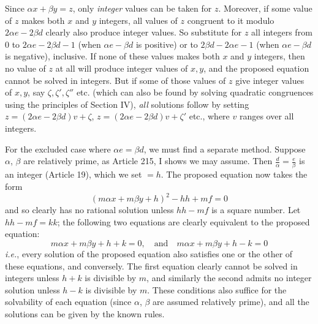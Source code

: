 Since $\alpha x+\beta y=z$, only \textit{integer} values can be taken for $z$. Moreover, if some value of $z$ makes both $x$ and $y$ integers, all values of $z$ congruent to it modulo $2\alpha e-2\beta d$ clearly also produce integer values. So substitute for $z$ all integers from $0$ to $2\alpha e-2\beta d-1$ (when $\alpha e-\beta d$ is positive) or to $2\beta d-2\alpha e-1$ (when $\alpha e-\beta d$ is negative), inclusive. If none of these values makes both $x$ and $y$ integers, then no value of $z$ at all will produce integer values of $x,y$, and the proposed equation cannot be solved in integers. But if some of those values of $z$ give integer values of $x,y$, say $\zeta,\zeta',\zeta''$ etc. (which can also be found by solving quadratic congruences using the principles of Section IV), \textit{all} solutions follow by setting $z=(2\alpha e-2\beta d)v+\zeta$, $z=(2\alpha e-2\beta d)v+\zeta'$ etc., where $v$ ranges over all integers.

For the excluded case where $\alpha e=\beta d$, we must find a separate method. Suppose $\alpha$, $\beta$ are relatively prime, as Article 215, I shows we may assume. Then $\frac{d}{\alpha}=\frac{e}{\beta}$ is an integer (Article 19), which we set $=h$. The proposed equation now takes the form
\[
(m\alpha x+m\beta y+h)^2-hh+mf=0
\]
and so clearly has no rational solution unless $hh-mf$ is a square number. Let $hh-mf=kk$; the following two equations are clearly equivalent to the proposed equation:
\[
m\alpha x+m\beta y+h+k=0,\quad\text{and}\quad
m\alpha x+m\beta y+h-k=0
\]
\textit{i.e.}, every solution of the proposed equation also satisfies one or the other of these equations, and conversely. The first equation clearly cannot be solved in integers unless $h+k$ is divisible by $m$, and similarly the second admits no integer solution unless $h-k$ is divisible by $m$. These conditions also suffice for the solvability of each equation (since $\alpha$, $\beta$ are assumed relatively prime), and all the solutions can be given by the known rules.

